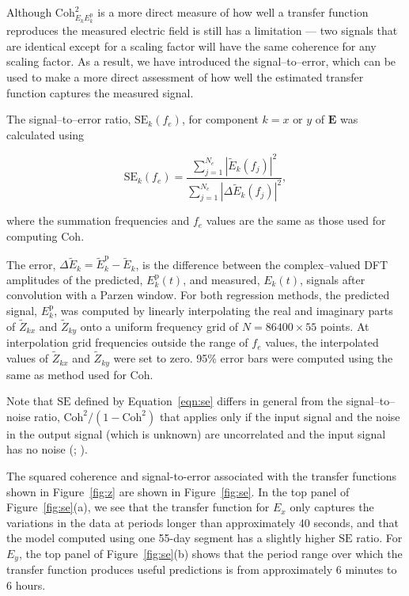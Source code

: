 \documentclass[pdflatex,sn-basic]{sn-jnl}%
\begin{document}
Although $\text{Coh}^2_{E_kE^\text{p}_k}$ is a more direct measure of how well a transfer function reproduces the measured electric field is still has a limitation --- two signals that are identical except for a scaling factor will have the same coherence for any scaling factor. As a result, we have introduced the signal--to--error, which can be used to make a more direct assessment of how well the estimated transfer function captures the measured signal.

The signal--to--error ratio, $\text{SE}_k(f_e)$, for component $k=x\mbox{ or }y$ of $\mathbf{E}$ was calculated using

\begin{equation}
\text{SE}_k(f_e) = \frac{\displaystyle\sum_{j=1}^{N_e} \left|\widetilde{E}_k(f_j)\right|^2}{\displaystyle\sum_{j=1}^{N_e}\left|\Delta\widetilde{E}_k(f_j)\right|^2},
\label{eqn:se}
\end{equation}

\noindent where the summation frequencies and $f_e$ values are the same as those used for computing $\text{Coh}$.

The error, $\Delta\widetilde{E}_k = \widetilde{E}_k^{\text{p}}-\widetilde{E}_k$, is the difference between the complex--valued DFT amplitudes of the predicted, $E_k^\text{p}(t)$, and measured, $E_k(t)$, signals after convolution with a Parzen window. For both regression methods, the predicted signal, $E_k^{\text{p}}$, was computed by linearly interpolating the real and imaginary parts of $\widetilde{Z}_{kx}$ and $\widetilde{Z}_{ky}$ onto a uniform frequency grid of $N=86400\times 55$ points. At interpolation grid frequencies outside the range of $f_e$ values, the interpolated values of $\widetilde{Z}_{kx}$ and $\widetilde{Z}_{ky}$ were set to zero. 95\% error bars were computed using the same as method used for $\text{Coh}$.

Note that $\text{SE}$ defined by Equation~\ref{eqn:se} differs in general from the signal--to--noise ratio, $\text{Coh}^2/(1-\text{Coh}^2)$ that applies only if the input signal and the noise in the output signal (which is unknown) are uncorrelated and the input signal has no noise (\cite{Miranda2006}; \cite{Pedersen1988}).

The squared coherence and signal-to-error associated with the transfer functions shown in Figure~\ref{fig:z} are shown in Figure~\ref{fig:se}. In the top panel of Figure~\ref{fig:se}(a), we see that the transfer function for $E_x$ only captures the variations in the data at periods longer than approximately 40 seconds, and that the model computed using one 55-day segment has a slightly higher $\text{SE}$ ratio. For $E_y$, the top panel of Figure~\ref{fig:se}(b) shows that the period range over which the transfer function produces useful predictions is from approximately 6 minutes to 6 hours.
\end{document}
